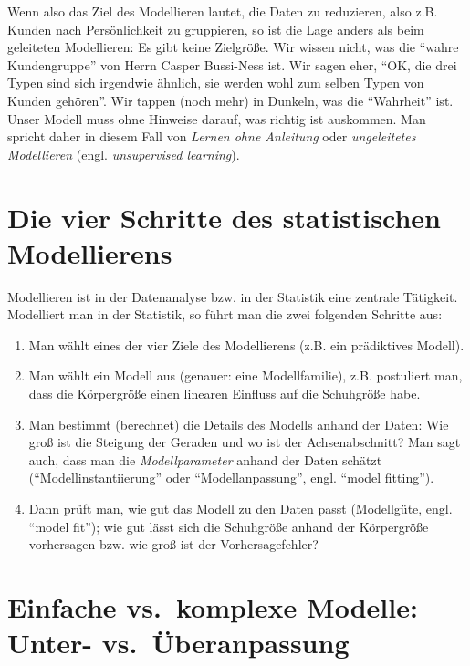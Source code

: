 \documentclass[12pt,ngerman,]{book}
\providecommand{\tightlist}{%
  \setlength{\itemsep}{0pt}\setlength{\parskip}{0pt}}
\theoremstyle{definition}
\theoremstyle{definition}
\theoremstyle{remark}
\begin{document}
Wenn also das Ziel des Modellieren lautet, die Daten zu reduzieren, also
z.B. Kunden nach Persönlichkeit zu gruppieren, so ist die Lage anders
als beim geleiteten Modellieren: Es gibt keine Zielgröße. Wir wissen
nicht, was die ``wahre Kundengruppe'' von Herrn Casper Bussi-Ness ist.
Wir sagen eher, ``OK, die drei Typen sind sich irgendwie ähnlich, sie
werden wohl zum selben Typen von Kunden gehören''. Wir tappen (noch
mehr) in Dunkeln, was die ``Wahrheit'' ist. Unser Modell muss ohne
Hinweise darauf, was richtig ist auskommen. Man spricht daher in diesem
Fall von \emph{Lernen ohne Anleitung} oder
\emph{ungeleitetes Modellieren} (engl. \emph{unsupervised
learning}).

\section{Die vier Schritte des statistischen
Modellierens}\label{die-vier-schritte-des-statistischen-modellierens}

Modellieren ist in der Datenanalyse bzw. in der Statistik eine zentrale
Tätigkeit. Modelliert man in der Statistik, so führt man die zwei
folgenden Schritte aus:

\begin{enumerate}
\def\labelenumi{\arabic{enumi}.}
\tightlist
\item
  Man wählt eines der vier Ziele des Modellierens (z.B. ein prädiktives
  Modell).
\item
  Man wählt ein Modell aus (genauer: eine Modellfamilie), z.B.
  postuliert man, dass die Körpergröße einen linearen Einfluss auf die
  Schuhgröße habe.
\item
  Man bestimmt (berechnet) die Details des Modells anhand der Daten: Wie
  groß ist die Steigung der Geraden und wo ist der Achsenabschnitt? Man
  sagt auch, dass man die \emph{Modellparameter} anhand der Daten
  schätzt (``Modellinstantiierung'' oder ``Modellanpassung'', engl.
  ``model fitting'').
\item
  Dann prüft man, wie gut das Modell zu den Daten passt (Modellgüte,
  engl. ``model fit''); wie gut lässt sich die Schuhgröße anhand der
  Körpergröße vorhersagen bzw. wie groß ist der Vorhersagefehler?
\end{enumerate}

\section{Einfache vs.~komplexe Modelle: Unter-
vs.~Überanpassung}\label{einfache-vs.komplexe-modelle-unter--vs.uberanpassung}
\end{document}
